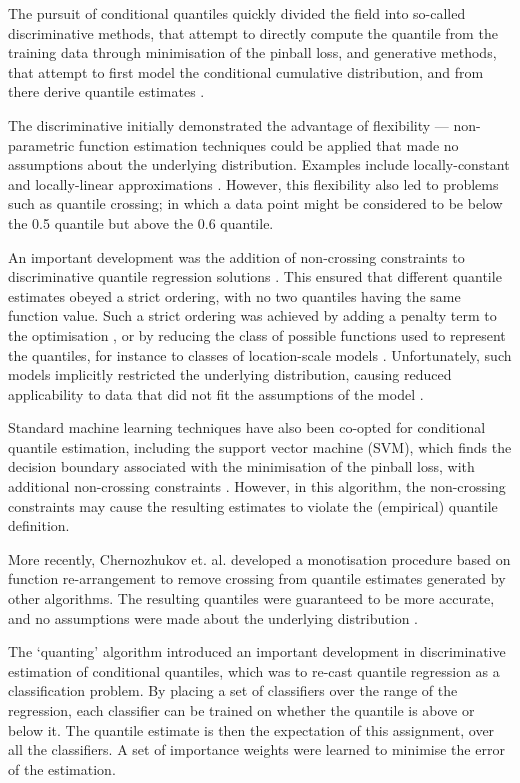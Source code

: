 \documentclass[twoside]{article} \usepackage{aistats2017}
\theoremstyle{definition}
\theoremstyle{remark}
\begin{document}
	The pursuit of conditional quantiles quickly divided the field into so-called discriminative methods, that attempt to directly compute the quantile from the training data through minimisation of the pinball loss, and generative methods, that attempt to first model the conditional cumulative distribution, and from there derive quantile estimates \citep{Koenker2005}.

	The discriminative initially demonstrated the advantage of flexibility --- non-parametric function estimation techniques could be applied that made no assumptions about the underlying distribution. Examples include locally-constant and locally-linear approximations \citep{Chaudhuri1991, Yu1998}. However, this flexibility also led to problems such as quantile crossing; in which a data point might be considered to be below the 0.5 quantile but above the 0.6 quantile\cite{Koenker2005}. 

	An important development was the addition of non-crossing constraints to discriminative quantile regression solutions \citep{He1997}. This ensured that different quantile estimates obeyed a strict ordering, with no two quantiles having the same function value. Such a strict ordering was achieved by adding a penalty term to the optimisation \citep{Cole1992}, or by reducing the class of possible functions used to represent the quantiles, for instance to classes of location-scale models \citep{Koenker1984, He1997}. Unfortunately, such models implicitly restricted the underlying distribution, causing reduced applicability to data that did not fit the assumptions of the model \citep{Koenker2005}.

	Standard machine learning techniques have also been co-opted for conditional quantile estimation, including the support vector machine (SVM), which finds the decision boundary associated with the minimisation of the pinball loss, with additional non-crossing constraints \citep{Takeuchi2006}. However, in this algorithm, the non-crossing constraints may cause the resulting estimates to violate the (empirical) quantile definition.

	More recently, Chernozhukov et. al. developed a monotisation procedure based on function re-arrangement to remove crossing from quantile estimates generated by other algorithms. The resulting quantiles were guaranteed to be more accurate, and no assumptions were made about the underlying distribution \citep{Chernozhukov2010}.

	The `quanting' algorithm \citep{Langford2006} introduced an important development in discriminative estimation of conditional quantiles, which was to re-cast quantile regression as a classification problem. By placing a set of classifiers over the range of the regression, each classifier can be trained on whether the quantile is above or below it. The quantile estimate is then the expectation of this assignment, over all the classifiers.  A set of importance weights were learned to minimise the error of the estimation.
\end{document}
